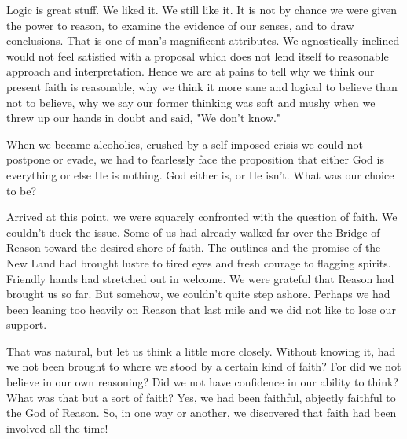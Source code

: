 \begin{biblechapter}
    Logic is great stuff. 
We liked it. 
We still like it. 
It is not by chance we were given the power to reason, 
to examine the evidence of our senses, 
and to draw conclusions. 
That is one of man's magnificent attributes. 
We agnostically inclined would not feel satisfied with a proposal which does not lend itself to reasonable approach and interpretation. 
Hence we are at pains to tell why we think our present faith is reasonable, 
why we think it more sane and logical to believe than not to believe, 
why we say our former thinking was soft and mushy when we threw up our hands in doubt and said, 
"We don't know."

When we became alcoholics, crushed by a self-imposed crisis we could not postpone or evade, 
we had to fearlessly face the proposition that either God is everything or else He is nothing. 
God either is, or He isn't. 
What was our choice to be?

Arrived at this point, we were squarely confronted with the question of faith. 
We couldn't duck the issue. 
Some of us had already walked far over the Bridge of Reason toward the desired shore of faith. 
The outlines and the promise of the New Land 
had brought lustre to tired eyes 
and fresh courage to flagging spirits. 
Friendly hands had stretched out in welcome. 
We were grateful that Reason had brought us so far. 
But somehow, we couldn't quite step ashore. 
Perhaps we had been leaning too heavily on Reason that last mile 
and we did not like to lose our support.

That was natural, but let us think a little more closely. 
Without knowing it, had we not been brought to where we stood by a certain kind of faith? 
For did we not believe in our own reasoning? 
Did we not have confidence in our ability to think? 
What was that but a sort of faith? 
Yes, we had been faithful, abjectly faithful to the God of Reason. 
So, in one way or another, we discovered that faith had been involved all the time!
\end{biblechapter}


